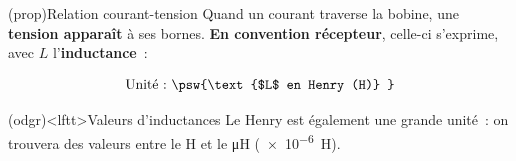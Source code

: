 \documentclass[../../main/main.tex]{subfiles}
\begin{document}
\begin{tcb*}[label=prop:Lcarac, sidebyside, righthand ratio=.3](prop){Relation
			courant-tension}
	Quand un courant traverse la bobine, une \textbf{tension apparaît} à ses
	bornes. \textbf{En convention récepteur}, celle-ci s'exprime, avec $L$
	l'\textbf{inductance}~:
	\smallbreak
	\begin{isd}[sidebyside align=top]
		\psw{%
			\[\boxed{u_L = L\dv{i}{t}}\]
		}%
		\vspace{-15pt}
		\tcblower
		\vspace{-10pt}
		\[
			\text{Unité~:~}
			\psw{%
				\text{$L$ en Henry (H)}
			}%
		\]
	\end{isd}
	\tcblower
	\vspace{-10pt}
	\begin{center}
		\vspace{-10pt}
	\end{center}
\end{tcb*}

\begin{tcb*}(odgr)<lftt>{Valeurs d'inductances}
	Le Henry est également une grande unité~: on trouvera des valeurs
	entre le \si{H} et le \si{\micro H} (\SI{e-6}{H}).
\end{tcb*}
\end{document}
